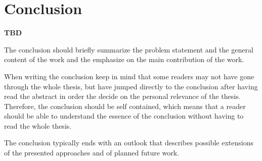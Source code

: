 \chapter{Conclusion}
\label{conclusion}

\textbf{TBD}

The conclusion should briefly summarize the problem statement and the general content of the work and the emphasize on the main contribution of the work.

When writing the conclusion keep in mind that some readers may not have gone through the whole thesis, but have jumped directly to the conclusion after having read the abstract in order the decide on the personal relevance of the thesis.
Therefore, the conclusion should be self contained, which means that a reader should be able to understand the essence of the conclusion without having to read the whole thesis.

The conclusion typically ends with an outlook that describes possible extensions of the presented approaches and of planned future work.
